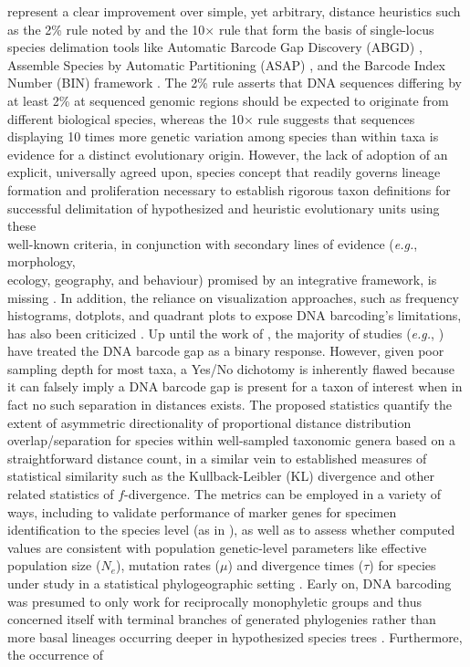 \documentclass[12pt]{article}
\begin{document}
\citet{phillips2024measure} represent a clear improvement over simple, yet arbitrary, distance heuristics such as the 2\% rule noted by \citet{hebert2003biological} and the 10$\times$ rule \citep{hebert2004identification} that form the basis of single-locus species delimation tools like Automatic Barcode Gap Discovery (ABGD) \citep{puillandre2011abgd}, Assemble Species by Automatic Partitioning (ASAP) \citep{puillandre2021asap}, and the Barcode Index Number (BIN) framework \citep{ratnasingham2013bin}. The 2\% rule asserts that DNA sequences differing by at least 2\% at sequenced genomic regions should be expected to originate from different biological species, whereas the 10$\times$ rule suggests that sequences displaying 10 times more genetic variation among species than within taxa is evidence for a distinct evolutionary origin. However, the lack of adoption of an explicit, universally agreed upon, species concept that readily governs lineage formation and proliferation necessary to establish rigorous taxon definitions for successful delimitation of hypothesized and heuristic evolutionary units using these \\ well-known criteria, in conjunction with secondary lines of evidence (\textit{e.g.}, morphology, \\ ecology, geography, and behaviour) promised by an integrative framework, is \\ missing \citep{rannala2015art, pante2016species, wells2022species}. In addition, the reliance on visualization approaches, such as frequency histograms, dotplots, and quadrant plots to expose DNA barcoding's limitations, has also been criticized \citep{collins2013seven, phillips2022lack}. Up until the work of \cite{phillips2024measure}, the majority of studies (\textit{e.g.}, \citet{young2021macer}) have treated the DNA barcode gap as a binary response. However, given poor sampling depth for most taxa, a Yes/No dichotomy is inherently flawed because it can falsely imply a DNA barcode gap is present for a taxon of interest when in fact no such separation in distances exists. The proposed statistics quantify the extent of asymmetric directionality of proportional distance distribution overlap/separation for species within well-sampled taxonomic genera based on a straightforward distance count, in a similar vein to established measures of statistical similarity such as the Kullback-Leibler (KL) divergence \citep{kullback1951information} and other related statistics of $f$-divergence. The metrics can be employed in a variety of ways, including to validate performance of marker genes for specimen identification to the species level (as in \citet{phillips2024measure}), as well as to assess whether computed values are consistent with population genetic-level parameters like effective population size ($N_e$), mutation rates ($\mu$) and divergence times ($\tau$) for species under study in a statistical phylogeographic setting \citep{knowles2002statistical, mather2019practical}. Early on, DNA barcoding was presumed to only work for reciprocally monophyletic groups and thus concerned itself with terminal branches of generated phylogenies rather than more basal lineages occurring deeper in hypothesized species trees \citep{mutanen2016species}. Furthermore, the occurrence of 
\end{document}
